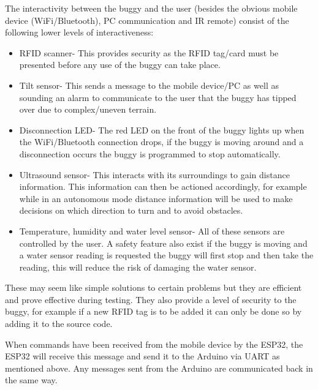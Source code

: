 \documentclass[8pt, a4paper]{article}
\begin{document}
The interactivity between the buggy and the user (besides the obvious mobile device (WiFi/Bluetooth), PC communication and IR remote) consist of the following lower levels of interactiveness:

\begin{itemize}
	\item RFID scanner- This provides security as the RFID tag/card must be presented before any use of the buggy can take place. 
	\item Tilt sensor- This sends a message to the mobile device/PC as well as sounding an alarm to communicate to the user that the buggy has tipped over due to complex/uneven terrain. 
	\item Disconnection LED- The red LED on the front of the buggy lights up when the WiFi/Bluetooth connection drops, if the buggy is moving around and a disconnection occurs the buggy is programmed to stop automatically.   
	\item Ultrasound sensor- This interacts with its surroundings to gain distance information. This information can then be actioned accordingly, for example while in an autonomous mode distance information will be used to make decisions on which direction to turn and to avoid obstacles. 
	\item Temperature, humidity and water level sensor- All of these sensors are controlled by the user. A safety feature also exist if the buggy is moving and a water sensor reading is requested the buggy will first stop and then take the reading, this will reduce the risk of damaging the water sensor. 
\end{itemize}

These may seem like simple solutions to certain problems but they are efficient and prove effective during testing. They also provide a level of security to the buggy, for example if a new RFID tag is to be added it can only be done so by adding it to the source code.  

When commands have been received from the mobile device by the ESP32, the ESP32 will receive this message and send it to the Arduino via UART as mentioned above. Any messages sent from the Arduino are communicated back in the same way. 
 
\end{document}
